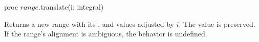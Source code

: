\begin{protohead}
proc $range$.translate(i: integral)
\end{protohead}
\begin{protobody}
Returns a new range with its ,  and  values
adjusted by $i$.  The  value is preserved.
If the range's alignment is ambiguous, the behavior is undefined.
\end{protobody}

